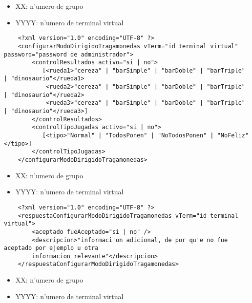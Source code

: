  
\begin{itemize}
    \item{XX: n'umero de grupo}
    \item{YYYY: n'umero de terminal virtual}
\end{itemize}

\begin{verbatim}
    <?xml version="1.0" encoding="UTF-8" ?>
    <configurarModoDirigidoTragamonedas vTerm="id terminal virtual" password="password de administrador">
        <controlResultados activo="si | no">
           [<rueda1>"cereza" | "barSimple" | "barDoble" | "barTriple" | "dinosaurio"</rueda1>
            <rueda2>"cereza" | "barSimple" | "barDoble" | "barTriple" | "dinosaurio"</rueda2>
            <rueda3>"cereza" | "barSimple" | "barDoble" | "barTriple" | "dinosaurio"</rueda3>]
        </controlResultados>
        <controlTipoJugadas activo="si | no">
           [<tipo>"Normal" | "TodosPonen" | "NoTodosPonen" | "NoFeliz"</tipo>]
        </controlTipoJugadas>
    </configurarModoDirigidoTragamonedas>
\end{verbatim}


 
\begin{itemize}
    \item{XX: n'umero de grupo}
    \item{YYYY: n'umero de terminal virtual}
\end{itemize}

\begin{verbatim}
    <?xml version="1.0" encoding="UTF-8" ?>
    <respuestaConfigurarModoDirigidoTragamonedas vTerm="id terminal virtual">
        <aceptado fueAceptado="si | no" />
        <descripcion>"informaci'on adicional, de por qu'e no fue aceptado por ejemplo u otra
        informacion relevante"</descripcion>
    </respuestaConfigurarModoDirigidoTragamonedas>
\end{verbatim}


 
\begin{itemize}
    \item{XX: n'umero de grupo}
    \item{YYYY: n'umero de terminal virtual}
\end{itemize}

